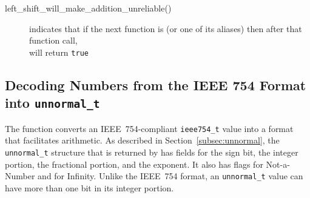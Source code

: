 \begin{itemize}
    \begin{description}
        \item[left\_shift\_will\_make\_addition\_unreliable()] indicates that if the next function is  (or one of its aliases) then after that function call, \\  will return \lstinline{true}
    \end{description}
\end{itemize}

\subsection{Decoding Numbers from the IEEE 754 Format into \texttt{unnormal\_t}} \label{subsec:decoding}

The  function converts an IEEE~754-compliant \lstinline{ieee754_t} value into a format that facilitates arithmetic.
As described in Section~\ref{subsec:unnormal}, the \lstinline{unnormal_t} structure that is returned by  has fields for the sign bit, the integer portion, the fractional portion, and the exponent.
It also has flags for Not-a-Number and for Infinity.
Unlike the IEEE~754 format, an \lstinline{unnormal_t} value can have more than one bit in its integer portion.

